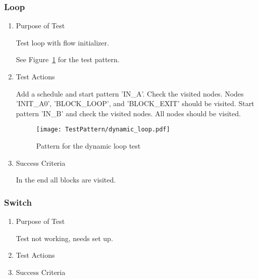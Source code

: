 \subsubsection{Loop}
\begin{enumerate}
	\item Purpose of Test

        Test loop with flow initializer.

	See Figure~\ref{fig:Pattern_for_the_dynamic_loop_test} for the test pattern.
	\item Test Actions

        Add a schedule and start pattern 'IN\_A'. Check the visited nodes. Nodes 'INIT\_A0', 'BLOCK\_LOOP', and 'BLOCK\_EXIT'
        should be visited. Start pattern 'IN\_B' and check the visited nodes. All nodes should be visited.
    \begin{figure}
        \centering
        \texttt{[image: TestPattern/dynamic\_loop.pdf]}
        \caption{Pattern for the dynamic loop test}
        \label{fig:Pattern_for_the_dynamic_loop_test}
    \end{figure}
	\item Success Criteria

	In the end all blocks are visited.
\end{enumerate}
\subsubsection{Switch}
\begin{enumerate}
	\item Purpose of Test

	Test not working, needs set up.
	\item Test Actions
	\item Success Criteria
\end{enumerate}
